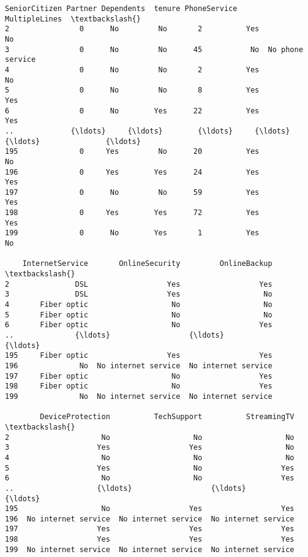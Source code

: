 \documentclass[11pt]{article}
\makeatletter
\newcommand{\boxspacing}{\kern\kvtcb@left@rule\kern\kvtcb@boxsep}
\newcommand{\prompt}[4]{
        {\ttfamily\llap{{\color{#2}[#3]:\hspace{3pt}#4}}\vspace{-\baselineskip}}
    }
\makeatother
\begin{document}
            \begin{tcolorbox}[breakable, size=fbox, boxrule=.5pt, pad at break*=1mm, opacityfill=0]
\prompt{Out}{outcolor}{5}{\boxspacing}
\begin{Verbatim}[commandchars=\\\{\}]
     SeniorCitizen Partner Dependents  tenure PhoneService     MultipleLines  \textbackslash{}
2                0      No         No       2          Yes                No
3                0      No         No      45           No  No phone service
4                0      No         No       2          Yes                No
5                0      No         No       8          Yes               Yes
6                0      No        Yes      22          Yes               Yes
..             {\ldots}     {\ldots}        {\ldots}     {\ldots}          {\ldots}               {\ldots}
195              0     Yes         No      20          Yes                No
196              0     Yes        Yes      24          Yes               Yes
197              0      No         No      59          Yes               Yes
198              0     Yes        Yes      72          Yes               Yes
199              0      No        Yes       1          Yes                No

    InternetService       OnlineSecurity         OnlineBackup  \textbackslash{}
2               DSL                  Yes                  Yes
3               DSL                  Yes                   No
4       Fiber optic                   No                   No
5       Fiber optic                   No                   No
6       Fiber optic                   No                  Yes
..              {\ldots}                  {\ldots}                  {\ldots}
195     Fiber optic                  Yes                  Yes
196              No  No internet service  No internet service
197     Fiber optic                   No                  Yes
198     Fiber optic                   No                  Yes
199              No  No internet service  No internet service

        DeviceProtection          TechSupport          StreamingTV  \textbackslash{}
2                     No                   No                   No
3                    Yes                  Yes                   No
4                     No                   No                   No
5                    Yes                   No                  Yes
6                     No                   No                  Yes
..                   {\ldots}                  {\ldots}                  {\ldots}
195                   No                  Yes                  Yes
196  No internet service  No internet service  No internet service
197                  Yes                  Yes                  Yes
198                  Yes                  Yes                  Yes
199  No internet service  No internet service  No internet service


\end{Verbatim}
\end{tcolorbox}
\end{document}
